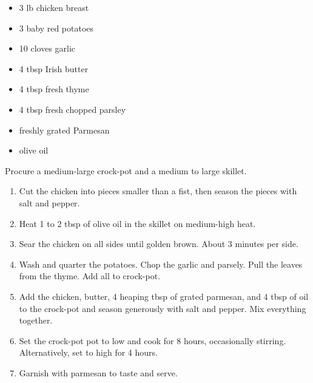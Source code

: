 
\RequirePackage{../recipe}





\thispagestyle{firstpage}

\ingredients
\begin{multicols}{2}
\begin{itemize}
    \item 3 lb chicken breast
    \item 3 baby red potatoes
    \item 10 cloves garlic
    \item 4 tbsp Irish butter
    \item 4 tbsp fresh thyme
    \item 4 tbsp fresh chopped parsley
    \item freshly grated Parmesan
    \item olive oil
\end{itemize}
\columnbreak
\end{multicols}

\instructions
Procure a medium-large crock-pot and a medium to large skillet.
\begin{enumerate}
    \item Cut the chicken into pieces smaller than a fist, then season the pieces with salt and pepper.
    \item Heat 1 to 2 tbsp of olive oil in the skillet on medium-high heat.
    \item Sear the chicken on all sides until golden brown. About 3 minutes per side.
    \item Wash and quarter the potatoes. Chop the garlic and parsely. Pull the leaves from the thyme. Add all to crock-pot.
    \item Add the chicken, butter, 4 heaping tbsp of grated parmesan, and 4 tbsp of oil to the crock-pot and season generously with salt and pepper. Mix everything together.
    \item Set the crock-pot pot to low and cook for 8 hours, occasionally stirring. Alternatively, set to high for 4 hours.
    \item Garnish with parmesan to taste and serve.
\end{enumerate}


